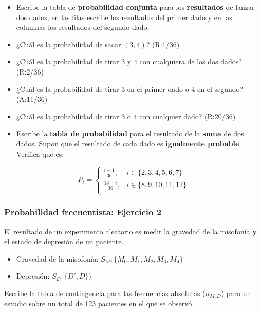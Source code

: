 \documentclass[
]{book}
\providecommand{\tightlist}{%
  \setlength{\itemsep}{0pt}\setlength{\parskip}{0pt}}
\begin{document}
\begin{itemize}
\item
  Escribe la tabla de \textbf{probabilidad conjunta} para los \textbf{resultados} de lanzar dos dados; en las filas escribe los resultados del primer dado y en las columnas los resultados del segundo dado.
\item
  ¿Cuál es la probabilidad de sacar \((3,4)\)? (R:1/36)
\item
  ¿Cuál es la probabilidad de tirar \(3\) y \(4\) con cualquiera de los dos dados? (R:2/36)
\item
  ¿Cuál es la probabilidad de tirar \(3\) en el primer dado o \(4\) en el segundo? (A:11/36)
\item
  ¿Cuál es la probabilidad de tirar \(3\) o \(4\) con cualquier dado? (R:20/36)
\item
  Escribe la \textbf{tabla de probabilidad} para el resultado de la \textbf{suma} de dos dados. Supon que el resultado de cada dado es \textbf{igualmente probable}. Verifica que es:
\end{itemize}

\[
    P_i= 
\begin{cases}
   \frac{i-1}{36},& i \in \{2,3,4,5,6, 7\} \\
\frac{13-i}{36},& i \in \{8,9,10,11,12\} \\ 
\end{cases}
\]

\hypertarget{probabilidad-frecuentista-ejercicio-2}{%
\subsubsection{Probabilidad frecuentista: Ejercicio 2}\label{probabilidad-frecuentista-ejercicio-2}}

El resultado de un experimento aleatorio es medir la gravedad de la misofonía \textbf{y} el estado de depresión de un paciente.

\begin{itemize}
\tightlist
\item
  Gravedad de la misofonía: \(S_M:\{M_0,M_1,M_2,M_3,M_4\}\)
\item
  Depresión: \(S_D:\{D', D\}\))
\end{itemize}

Escribe la tabla de contingencia para las frecuencias absolutas (\(n_{M,D}\)) para un estudio sobre un total de 123 pacientes en el que se observó
\end{document}

